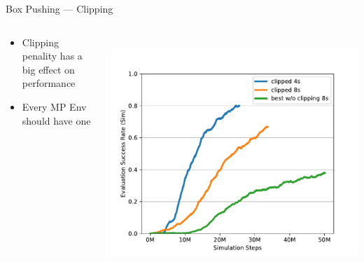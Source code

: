 \documentclass[16:9,en,navbarinfooter]{sdqbeamer}
\begin{document}
\begin{frame}{Box Pushing --- Clipping}

	\begin{columns}
		\begin{column}{0.4\textwidth}
			\vspace{1cm}
			\begin{itemize}
				\item Clipping penality has a big effect on performance
				\item Every MP Env should have one
			\end{itemize}
		\end{column}
		\begin{column}{0.6\textwidth}
			\vspace{.2cm} \\
			\includegraphics[width=\linewidth]{media/clipping_reward.pdf}

		\end{column}
	\end{columns}
\end{frame}
\end{document}
